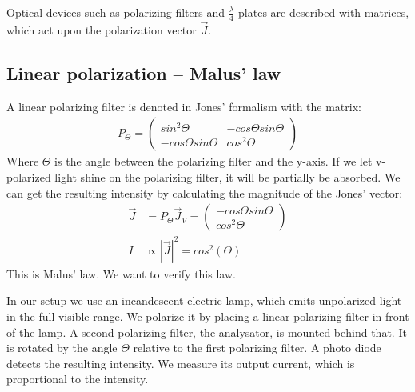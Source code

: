 \documentclass[a4paper,10pt,twocolumn]{article}
\newcommand{\quaterWavePlates}{$\frac{\lambda}{4}$-plates }
\begin{document}
    Optical devices such as polarizing filters and \quaterWavePlates are described with matrices, which act
    upon the polarization vector $\vec{J}$. 
    
    \subsection{Linear polarization -- Malus' law}
    \label{subsec:MalusLaw}
    
    
    A linear polarizing filter is denoted in Jones' formalism with the matrix:
    \begin{align*}
        P_{\Theta} = \begin{pmatrix} sin^2\Theta & - cos\Theta sin\Theta \\
                        - cos\Theta sin\Theta & cos^2\Theta \end{pmatrix}
    \end{align*}
    Where $\Theta$ is the angle between the polarizing filter and the y-axis.
    If we let v-polarized light shine on the polarizing filter, it will be partially be absorbed.
    We can get the resulting intensity by calculating the magnitude of the Jones' vector:
    \begin{align}
        \label{eq:theoMaluslaw}
        \vec{J} &= P_{\Theta} \vec{J}_V = \begin{pmatrix} -cos\Theta sin\Theta \\
                                               cos^2\Theta\end{pmatrix} \\
        I &\propto | \vec{J} |^2 = cos^2(\Theta) 
    \end{align}
    This is Malus' law.
    We want to verify this law.
    
    In our setup we use an incandescent electric lamp, which emits unpolarized light in the full
    visible range.
    We polarize it by placing a linear polarizing filter in front of the lamp.
    A second polarizing filter, the analysator, is mounted behind that.
    It is rotated by the angle $\Theta$ relative to the first polarizing filter.
    A photo diode detects the resulting intensity.
    We measure its output current, which is proportional to the intensity.
    
\end{document}
